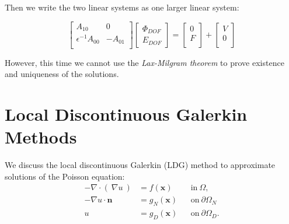 \documentclass[10pt]{report}
\numberwithin{equation}{section}
\begin{document}
\noindent
Then we write the two linear systems as one larger linear system:


\vspace{2mm}


\begin{equation}
\left[ \begin{matrix}
 A_{10} & 0 \\
\epsilon^{-1} A_{00} & -A_{01} \\
\end{matrix} \right]
\left[ \begin{matrix}
\Phi_{DOF} \\
E_{DOF}
\end{matrix} \right] =
\left[ \begin{matrix}
0 \\
F  \\      
\end{matrix}\right]  + 
\left[ \begin{matrix}
V\\
0 \\
\end{matrix} \right]
\end{equation}

\vspace{2mm}

\noindent
However, this time we cannot use the \textit{Lax-Milgram theorem} to prove existence and uniqueness of the solutions.


\chapter{Local Discontinuous Galerkin Methods}
We discuss the local discontinuous Galerkin (LDG) method to approximate solutions of the Poisson equation:
\begin{equation}
\begin{aligned}
- \nabla \cdot  \left(\ \nabla u \ \right)&= f(\textbf{x}) && \mbox{in} \ \Omega, \\
-\nabla u \cdot \textbf{n}  &= g_{N}(\textbf{x}) && \mbox{on} \ \partial \Omega_{N} \\
u &= g_{D}(\textbf{x}) && \mbox{on}  \ \partial \Omega_{D}.
\end{aligned}
\end{equation}
\end{document}
